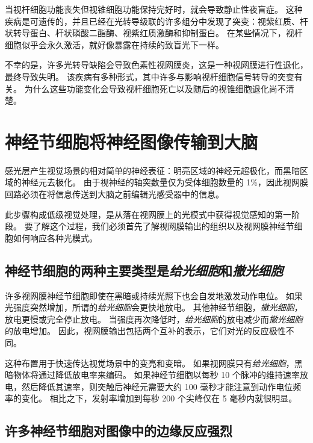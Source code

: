 当视杆细胞功能丧失但视锥细胞功能保持完好时，就会导致静止性夜盲症。
这种疾病是可遗传的，并且已经在光转导级联的许多组分中发现了突变：视紫红质、杆状转导蛋白、杆状磷酸二酯酶、视紫红质激酶和抑制蛋白。
在某些情况下，视杆细胞似乎会永久激活，就好像暴露在持续的致盲光下一样。


不幸的是，许多光转导缺陷会导致色素性视网膜炎，这是一种视网膜进行性退化，最终导致失明。
该疾病有多种形式，其中许多与影响视杆细胞信号转导的突变有关。
为什么这些功能变化会导致视杆细胞死亡以及随后的视锥细胞退化尚不清楚。



\section{神经节细胞将神经图像传输到大脑}

感光层产生视觉场景的相对简单的神经表征：明亮区域的神经元超极化，而黑暗区域的神经元去极化。
由于视神经的轴突数量仅为受体细胞数量的 1\%，因此视网膜回路必须在将信息传送到大脑之前编辑光感受器中的信息。


此步骤构成低级视觉处理，是从落在视网膜上的光模式中获得视觉感知的第一阶段。
要了解这个过程，我们必须首先了解视网膜输出的组织以及视网膜神经节细胞如何响应各种光模式。



\subsection{神经节细胞的两种主要类型是\textit{给光细胞}和\textit{撤光细胞}}

许多视网膜神经节细胞即使在黑暗或持续光照下也会自发地激发动作电位。
如果光强度突然增加，所谓的\textit{给光细胞}会更快地放电。
其他神经节细胞，\textit{撤光细胞}，放电更慢或完全停止放电。
当强度再次降低时，\textit{给光细胞}的放电减少而\textit{撤光细胞}的放电增加。
因此，视网膜输出包括两个互补的表示，它们对光的反应极性不同。


这种布置用于快速传达视觉场景中的变亮和变暗。
如果视网膜只有\textit{给光细胞}，黑暗物体将通过降低放电率来编码。
如果神经节细胞以每秒 10 个脉冲的维持速率放电，然后降低其速率，则突触后神经元需要大约 100 毫秒才能注意到动作电位频率的变化。
相比之下，发射率增加到每秒 200 个尖峰仅在 5 毫秒内就很明显。



\subsection{许多神经节细胞对图像中的边缘反应强烈}

